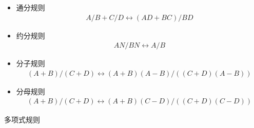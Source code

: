 \begin{itemize}
  \item {\kaishu 通分规则} 
  \begin{gather*}
  A / B + C / D \longleftrightarrow (AD+BC) / BD 
  \end{gather*}

  \item {\kaishu 约分规则} 
  \begin{gather*}
  AN / BN \longleftrightarrow A / B 
  \end{gather*}

  \item {\kaishu 分子规则} 
  \begin{gather*}
  (A+B) / (C+D) \longleftrightarrow (A+B)(A-B) / ((C+D)(A-B)) 
  \end{gather*}

  \item {\kaishu 分母规则} 
  \begin{gather*}
  (A+B) / (C+D) \longleftrightarrow (A+B)(C-D) / ((C+D)(C-D)) 
  \end{gather*}
\end{itemize}


\vspace{1mm}
\begin{center}
{\kaishu{} 多项式规则}
\end{center}
\vspace{1mm}

